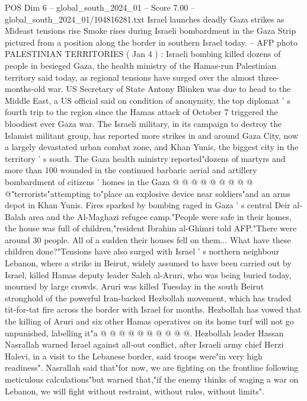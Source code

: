 \begin{textsample}{POS Dim 6 – global\_south\_2024\_01 – Score 7.00 – global\_south\_2024\_01/104816281.txt}  \label{ex:f6_pos_098}
Israel launches deadly Gaza strikes as Mideast tensions rise Smoke rises during Israeli bombardment in the Gaza Strip pictured from a position along the border in southern Israel today. -- AFP photo PALESTINIAN TERRITORIES ( Jan 4 ) : Israeli bombing killed dozens of people in besieged Gaza, the health ministry of the Hamas-run Palestinian territory said today, as regional tensions have surged over the almost three-months-old war.
US Secretary of State Antony Blinken was due to head to the Middle East, a US official said on condition of anonymity, the top diplomat ' s fourth trip to the region since the Hamas attack of October 7 triggered the bloodiest ever Gaza war.
The Israeli military, in its campaign to destroy the Islamist militant group, has reported more strikes in and around Gaza City, now a largely devastated urban combat zone, and Khan Yunis, the biggest city in the territory ' s south.
The Gaza health ministry reported"dozens of martyrs and more than 100 wounded in the continued barbaric aerial and artillery bombardment of citizens ' homes in the Gaza @ @ @ @ @ @ @ @ @ @"terrorists"attempting to"place an explosive device near soldiers"and an arms depot in Khan Yunis.
Fires sparked by bombing raged in Gaza ' s central Deir al-Balah area and the Al-Maghazi refugee camp."People were safe in their homes, the house was full of children,"resident Ibrahim al-Ghimri told AFP."There were around 30 people.
All of a sudden their houses fell on them...
What have these children done?"Tensions have also surged with Israel ' s northern neighbour Lebanon, where a strike in Beirut, widely assumed to have been carried out by Israel, killed Hamas deputy leader Saleh al-Aruri, who was being buried today, mourned by large crowds.
Aruri was killed Tuesday in the south Beirut stronghold of the powerful Iran-backed Hezbollah movement, which has traded tit-for-tat fire across the border with Israel for months.
Hezbollah has vowed that the killing of Aruri and six other Hamas operatives on its home turf will not go unpunished, labelling it"a @ @ @ @ @ @ @ @ @ @.
Hezbollah leader Hassan Nasrallah warned Israel against all-out conflict, after Israeli army chief Herzi Halevi, in a visit to the Lebanese border, said troops were"in very high readiness".
Nasrallah said that"for now, we are fighting on the frontline following meticulous calculations"but warned that,"if the enemy thinks of waging a war on Lebanon, we will fight without restraint, without rules, without limits".

\end{textsample}
